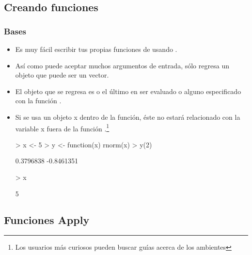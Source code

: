 \subsection{Creando funciones}

\begin{frame}
  \frametitle{Bases}
  \begin{itemize}
  \item Es muy f\'acil escribir tus propias funciones de  usando .
  \item As\'i como puede aceptar muchos argumentos de entrada, s\'olo regresa \alert{un} objeto que puede ser un vector.
  \item El objeto que se regresa es o el \'ultimo en ser evaluado o alguno especificado con la funci\'on . 
  \item Si se usa un objeto x dentro de la funci\'on, \'este no estar\'a relacionado con la variable x fuera de la funci\'on .\footnote{Los usuarios m\'as curiosos pueden buscar gu\'ias acerca de los ambientes}
\begin{Schunk}
\begin{Sinput}
> x <- 5
> y <- function(x) rnorm(x)
> y(2)
\end{Sinput}
\begin{Soutput}
[1]  0.3796838 -0.8461351
\end{Soutput}
\begin{Sinput}
> x
\end{Sinput}
\begin{Soutput}
[1] 5
\end{Soutput}
\end{Schunk}
  \end{itemize}
\end{frame}

\subsection{Funciones Apply}

